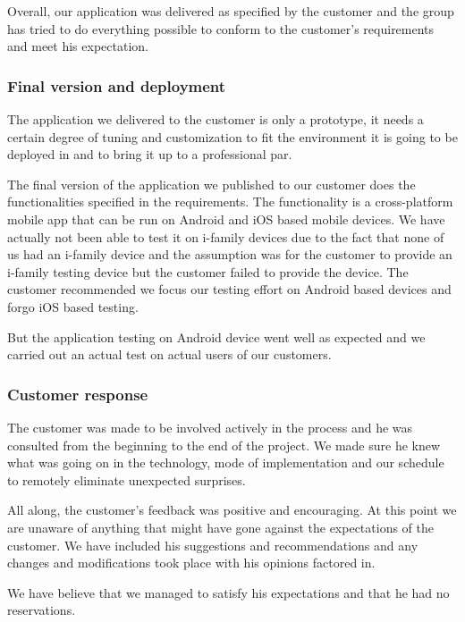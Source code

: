     Overall, our application was delivered as specified by the customer and the group has tried to do everything possible to conform to the customer's requirements and meet his expectation.
	\subsubsection{Final version and deployment}
The application we delivered to the customer is only a prototype, it needs a certain degree of tuning and customization to fit the environment it is going to be deployed in and to bring it up to a professional par.

The final version of the application we published to our customer does the functionalities specified in the requirements. The functionality is a cross-platform mobile app that can be run on Android and iOS based mobile devices. We have actually not been able to test it on i-family devices due to the fact that none of us had an i-family device and the assumption was for the customer to provide an i-family testing device but the customer failed to provide the device. The customer recommended we focus our testing effort on Android based devices and forgo iOS based testing.

But the application testing on Android device went well as expected and we carried out an actual test on actual users of our customers.


	\subsubsection{Customer response}
The customer was made to be involved actively in the process and he was consulted from the beginning to the end of the project. We made sure he knew what was going on in the technology, mode of implementation and our schedule to remotely eliminate unexpected surprises.

All along, the customer's feedback was positive and encouraging. At this point we are unaware of anything that might have gone against the expectations of the customer. 
We have included his suggestions and recommendations and any changes and modifications took place with his opinions factored in.

We have believe that we managed to satisfy his expectations and that he had no reservations.
	


